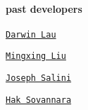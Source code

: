 \paragraph*{past developers}


\begin{DoxyItemize}
\item \href{https://github.com/darwinlau}{\tt Darwin Lau}
\item \href{https://github.com/mingxing-liu}{\tt Mingxing Liu}
\item \href{https://github.com/salini}{\tt Joseph Salini}
\item \href{https://github.com/sovannara-hak}{\tt Hak Sovannara} 
\end{DoxyItemize}